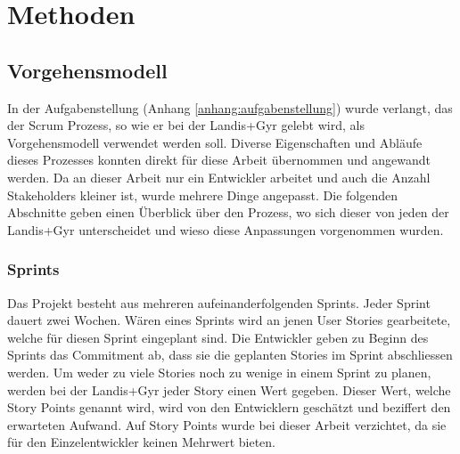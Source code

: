 \chapter{Methoden}






\section{Vorgehensmodell}\label{vorgehen}
In der Aufgabenstellung (Anhang \ref{anhang:aufgabenstellung}) wurde verlangt, das der Scrum Prozess, so wie er bei der Landis+Gyr gelebt wird, als Vorgehensmodell verwendet werden soll.
Diverse Eigenschaften und Abläufe dieses Prozesses konnten direkt für diese Arbeit übernommen und angewandt werden.
Da an dieser Arbeit nur ein Entwickler arbeitet und auch die Anzahl Stakeholders kleiner ist, wurde mehrere Dinge angepasst.
Die folgenden Abschnitte geben einen Überblick über den Prozess, wo sich dieser von jeden der Landis+Gyr unterscheidet und wieso diese Anpassungen vorgenommen wurden.

\subsection{Sprints}
Das Projekt besteht aus mehreren aufeinanderfolgenden Sprints.
Jeder Sprint dauert zwei Wochen.
Wären eines Sprints wird an jenen User Stories gearbeitete, welche für diesen Sprint eingeplant sind.
Die Entwickler geben zu Beginn des Sprints das Commitment ab, dass sie die geplanten Stories im Sprint abschliessen werden.
Um weder zu viele Stories noch zu wenige in einem Sprint zu planen, werden bei der Landis+Gyr jeder Story einen Wert gegeben.
Dieser Wert, welche Story Points genannt wird, wird von den Entwicklern geschätzt und beziffert den erwarteten Aufwand.
Auf Story Points wurde bei dieser Arbeit verzichtet, da sie für den Einzelentwickler keinen Mehrwert bieten.

